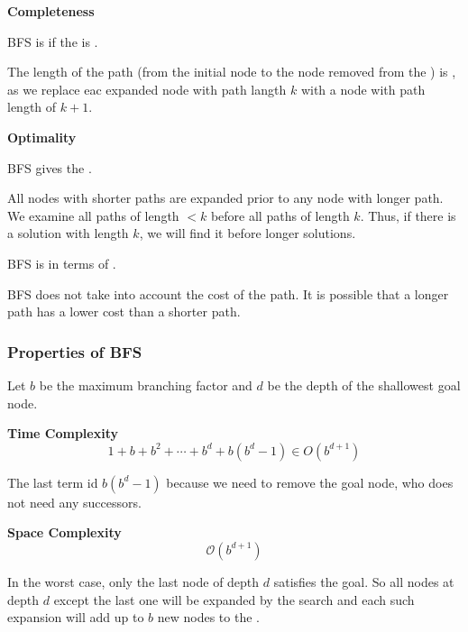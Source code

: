 \begin{listu}
    \item \textbf{Completeness}
    
    \begin{listu}
        \item BFS is  if the  is .
        \item The length of the path (from the initial node to the node removed from the \Frontier) is , as we replace eac expanded node with path langth $k$ with a node with path length of $k + 1$. 
    \end{listu}

    \item \textbf{Optimality}
    
    \begin{listu}
        \item BFS gives the . 

        All nodes with shorter paths are expanded prior to any node with longer path. We examine all paths of length $< k$ before all paths of length $k$. Thus, if there is a solution with length $k$, we will find it before longer solutions. 

        \item BFS is  in terms of .
        
        BFS does not take into account the cost of the path. It is possible that a longer path has a lower cost than a shorter path.
    \end{listu}
\end{listu}


\subsubsection{Properties of BFS}

Let $b$ be the maximum branching factor and $d$ be the depth of the shallowest goal node.

\begin{listu}
    \item \textbf{Time Complexity} \[
        1 + b + b^2 + \cdots + b^d + b(b^d - 1) \in O(b^{d+1})
    \]

    The last term id $b(b^d - 1)$ because we need to remove the goal node, who does not need any successors.

    \item \textbf{Space Complexity} \[
        \mathcal{O}(b^{d+1})
    \]
    
    In the worst case, only the last node of depth $d$ satisfies the goal. So all nodes at depth $d$ except the last one will be expanded by the search and each such expansion will add up to $b$ new nodes to the \Frontier.
\end{listu}

